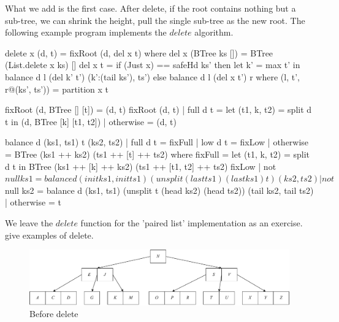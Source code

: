\documentclass[b5paper]{article}
\begin{document}
What we add is the first case. After delete, if the root contains nothing but a sub-tree, we can shrink the height, pull the single sub-tree as the new root. The following example program implements the $delete$ algorithm.

\begin{Haskell}
delete x (d, t) = fixRoot (d, del x t) where
    del x (BTree ks []) = BTree (List.delete x ks) []
    del x t = if (Just x) == safeHd ks' then
                let k' = max t' in
                   balance d l (del k' t') (k':(tail ks'), ts')
              else balance d l (del x t') r
      where
        (l, t', r@(ks', ts')) = partition x t

fixRoot (d, BTree [] [t]) = (d, t)
fixRoot (d, t) | full d t  = let (t1, k, t2) = split d t in
                               (d, BTree [k] [t1, t2])
               | otherwise = (d, t)

balance d (ks1, ts1) t (ks2, ts2)
    | full d t  = fixFull
    | low  d t  = fixLow
    | otherwise = BTree (ks1 ++ ks2) (ts1 ++ [t] ++ ts2)
  where
    fixFull = let (t1, k, t2) = split d t in
                BTree (ks1 ++ [k] ++ ks2) (ts1 ++ [t1, t2] ++ ts2)
    fixLow | not $ null ks1 = balance d (init ks1, init ts1)
                                      (unsplit (last ts1) (last ks1) t)
                                      (ks2, ts2)
           | not $ null ks2 = balance d (ks1, ts1)
                                      (unsplit t (head ks2) (head ts2))
                                      (tail ks2, tail ts2)
           | otherwise = t
\end{Haskell}

We leave the $delete$ function for the 'paired list' implementation as an exercise.  give examples of delete.

\begin{figure}[htbp]
  \centering
  \includegraphics[scale=0.33]{img/btree-del-before}
  \caption{Before delete}
  \label{fig:btree-del-before}
\end{figure}
\end{document}
